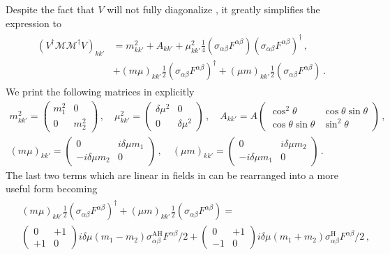 Despite the fact that $V$ will not fully diagonalize , it greatly simplifies the expression to
\begin{align}
    \begin{split}
    \label{hermz:2}
    (V^{\dag}\mathcal{M}\mathcal{M}^{\dag}V)_{kk'}
    &=m_{kk'}^{2}+A_{kk'}+\mu^{2}_{kk'}\frac{1}{4}\left(\sigma_{\alpha\beta}F^{\alpha\beta}\right)\left(\sigma_{\alpha\beta}F^{\alpha\beta}\right)^{\dag}\,,\\
    &+(m\mu)_{kk'}\frac{1}{2}\left(\sigma_{\alpha\beta}F^{\alpha\beta}\right)^{\dag}
    +(\mu m)_{kk'}\frac{1}{2}\left(\sigma_{\alpha\beta}F^{\alpha\beta}\right)\,.
    \end{split}
\end{align}
We print the following matrices in  explicitly %
\begin{align}
    \label{hermz:3}
    m_{kk'}^{2}\!=\!
    \begin{pmatrix}
        m_{1}^{2} & 0\\
        0 & m_{2}^{2}
    \end{pmatrix}\,,\quad
    \mu^{2}_{kk'}\!=\!
    \begin{pmatrix}
        \delta\mu^{2} & 0\\
        0 & \delta\mu^{2}
    \end{pmatrix}\,,\quad
    A_{kk'}\!=\!A
    \begin{pmatrix}
        \cos^{2}\theta & \cos\theta\sin\theta\\
        \cos\theta\sin\theta & \sin^{2}\theta
    \end{pmatrix}\,,\\
    (m\mu)_{kk'}=
    \begin{pmatrix}
        0 & i\delta\mu m_{1}\\
        -i\delta\mu m_{2} & 0
    \end{pmatrix}\,,\quad
    (\mu m)_{kk'}=
    \begin{pmatrix}
        0 & i\delta\mu m_{2}\\
        -i\delta\mu m_{1} & 0
    \end{pmatrix}\,.    
\end{align}
The last two terms which are linear in fields in  can be rearranged into a more useful form becoming
\begin{align}
    \label{hermz:4}
    \begin{split}
    &(m\mu)_{kk'}\frac{1}{2}\left(\sigma_{\alpha\beta}F^{\alpha\beta}\right)^{\dag}
    +(\mu m)_{kk'}\frac{1}{2}\left(\sigma_{\alpha\beta}F^{\alpha\beta}\right)=\\
    &\begin{pmatrix}
        0 & +1\\
        +1 & 0
    \end{pmatrix}i\delta\mu(m_{1}-m_{2})\sigma_{\alpha\beta}^\mathrm{AH}F^{\alpha\beta}/2
    +
    \begin{pmatrix}
        0 & +1\\
        -1 & 0
    \end{pmatrix}i\delta\mu(m_{1}+m_{2})\sigma_{\alpha\beta}^\mathrm{H}F^{\alpha\beta}/2\,,
    \end{split}
\end{align}
